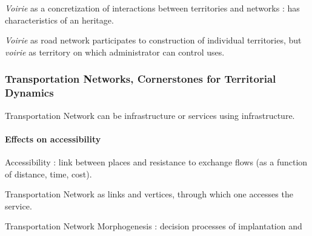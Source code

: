 \textit{Voirie} as a concretization of interactions between territories and networks : has characteristics of an heritage.

\textit{Voirie} as road network participates to construction of individual territories, but \textit{voirie} as territory on which administrator can control uses.


\subsubsection*{Transportation Networks, Cornerstones for Territorial Dynamics}

Transportation Network can be infrastructure or services using infrastructure.

\paragraph{Effects on accessibility}

Accessibility : link between places and resistance to exchange flows (as a function of distance, time, cost).

Transportation Network as links and vertices, through which one accesses the service.

Transportation Network Morphogenesis : decision processes of implantation and 









